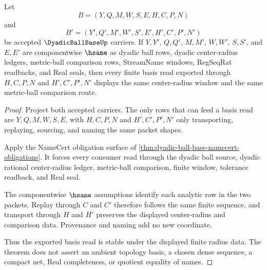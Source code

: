 \begin{theorem}
\label{thm:dyadic-ball-base-finite-radius-stability}
Let
$$
B=(Y,Q,M,W,S,E,H,C,P,N)
$$
and
$$
B'=(Y',Q',M',W',S',E',H',C',P',N')
$$
be accepted $\DyadicBallBaseUp$ carriers. If $Y,Y'$, $Q,Q'$, $M,M'$, $W,W'$, $S,S'$, and $E,E'$ are componentwise $\hsame$ as dyadic ball rows, dyadic center-radius ledgers, metric-ball comparison rows, StreamName windows, RegSeqRat readbacks, and Real seals, then every finite basis read exported through $H,C,P,N$ and $H',C',P',N'$ displays the same center-radius window and the same metric-ball comparison route.
\end{theorem}
\begin{proof}
Project both accepted carriers. The only rows that can feed a basis read are $Y,Q,M,W,S,E$, with $H,C,P,N$ and $H',C',P',N'$ only transporting, replaying, sourcing, and naming the same packet shapes.

Apply the NameCert obligation surface of \autoref{thm:dyadic-ball-base-namecert-obligations}. It forces every consumer read through the dyadic ball source, dyadic rational center-radius ledger, metric-ball comparison, finite window, tolerance readback, and Real seal.

The componentwise $\hsame$ assumptions identify each analytic row in the two packets. Replay through $C$ and $C'$ therefore follows the same finite sequence, and transport through $H$ and $H'$ preserves the displayed center-radius and comparison data. Provenance and naming add no new coordinate.

Thus the exported basis read is stable under the displayed finite radius data. The theorem does not assert an ambient topology basis, a chosen dense sequence, a compact net, Real completeness, or quotient equality of names.
\end{proof}

